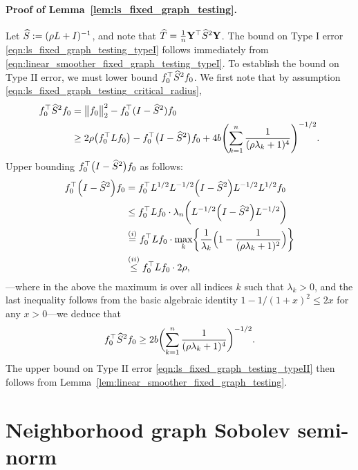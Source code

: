 \paragraph{Proof of Lemma~\ref{lem:ls_fixed_graph_testing}.}
Let $\widehat{S} := (\rho L + I)^{-1}$, and note that $\widehat{T} = \frac{1}{n}{\bf Y}^{\top} \widehat{S}^2 {\bf Y}$. The bound on Type I error \eqref{eqn:ls_fixed_graph_testing_typeI} follows immediately from \eqref{eqn:linear_smoother_fixed_graph_testing_typeI}. 
To establish the bound on Type II error, we must lower bound $f_0^{\top} \widehat{S}^2 f_0$. We first note that by assumption \eqref{eqn:ls_fixed_graph_testing_critical_radius},
\begin{align*}
f_0^{\top} \widehat{S}^2 f_0 & = \bigl\|f_0\bigr\|_2^2 - f_0^{\top}(I - \widehat{S}^2)f_0 \\
& \geq 2 \rho \bigl(f_0^{\top} L f_0\bigr) - f_0^{\top}\bigl(I - \widehat{S}^2\bigr)f_0 + 4b \Biggl(\sum_{k = 1}^{n} \frac{1}{(\rho\lambda_k + 1)^4} \Biggr)^{-1/2}.
\end{align*}
Upper bounding $f_0^{\top}\bigl(I - \widehat{S}^2\bigr)f_0$ as follows:
\begin{equation*}
\begin{aligned}
f_0^{\top} \Bigl(I - \widehat{S}^2\Bigr) f_0  & = f_0^{\top} L^{1/2} L^{-1/2}\Bigl(I - \widehat{S}^2\Bigr) L^{-1/2} L^{1/2} f_0 \\ 
& \leq f_0^{\top} L f_0 \cdot  \lambda_{n}\biggl(L^{-1/2}\Bigl(I - \widehat{S}^2\Bigr) L^{-1/2}\biggr) \\ 
& \overset{(i)}{=}  f_0^{\top} L f_0 \cdot \max_{k} \biggl\{ \frac{1}{\lambda_k} \Bigl(1 - \frac{1}{(\rho \lambda_k + 1)^2}\Bigr) \biggr\} \\
& \overset{(ii)}{\leq} f_0^{\top} L f_0 \cdot 2\rho,
\end{aligned}
\end{equation*}
---where in the above the maximum is over all indices $k$ such that $\lambda_k > 0$, and the last inequality follows from the basic algebraic identity $1 - 1/(1 + x)^2 \leq 2 x$ for any $x > 0$---we deduce that
\begin{equation*}
f_0^{\top} \widehat{S}^2 f_0 \geq 2b \biggl(\sum_{k = 1}^{n} \frac{1}{(\rho\lambda_k + 1)^4} \biggr)^{-1/2}.
\end{equation*} 
The upper bound on Type II error \eqref{eqn:ls_fixed_graph_testing_typeII} then follows from Lemma~\ref{lem:linear_smoother_fixed_graph_testing}.

\section{Neighborhood graph Sobolev semi-norm}
\label{sec:graph_sobolev_seminorm}

